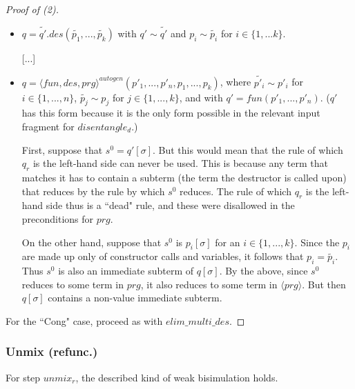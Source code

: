\documentclass[11pt]{article} %
\begin{document}
\begin{proof}[Proof of (2)]
\begin{enumerate}
\begin{itemize}
\begin{itemize}
\item $q = \widetilde{q'}.des(\widetilde{p_1}, ..., \widetilde{p_k})$ with $q' \sim \widetilde{q'}$ and $p_i \sim \widetilde{p_i}$ for $i \in \{1, ... k\}$.

[...]

\item $q = \langle fun, des, prg \rangle^{autogen}(p'_1, ..., p'_n, p_1, ..., p_k)$, where $\widetilde{p'_i} \sim p'_i$ for $i \in \{1, ..., n\}$, $\widetilde{p_j} \sim p_j$ for $j \in \{1, ..., k\}$, and with $q' = fun(p'_1, ..., p'_n)$. ($q'$ has this form because it is the only form possible in the relevant input fragment for $disentangle_d$.)

First, suppose that $s^0 = q'[\sigma]$. But this would mean that the rule of which $q_r$ is the left-hand side can never be used. This is because any term that matches it has to contain a subterm (the term the destructor is called upon) that reduces by the rule by which $s^0$ reduces. The rule of which $q_r$ is the left-hand side thus is a ``dead" rule, and these were disallowed in the preconditions for $prg$.

On the other hand, suppose that $s^0$ is $p_i[\sigma]$ for an $i \in \{1, ..., k\}$. Since the $p_i$ are made up only of constructor calls and variables, it follows that $p_i = \widetilde{p_i}$. Thus $s^0$ is also an immediate subterm of $q[\sigma]$. By the above, since $s^0$ reduces to some term in $prg$, it also reduces to some term in $\langle prg \rangle$. But then $q[\sigma]$ contains a non-value immediate subterm.

\end{itemize}

\end{itemize}

\end{enumerate}

For the ``Cong" case, proceed as with $elim\_multi\_des$.

\end{proof}

\subsubsection{Unmix (refunc.)}

For step $unmix_r$, the described kind of weak bisimulation holds.
\end{document}
